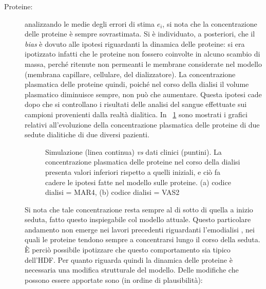 \begin{description}
	\item[Proteine:] analizzando le medie degli errori di stima $e_i$, si nota che la concentrazione delle proteine è sempre sovrastimata. Si è individuato, a posteriori, che il \textit{bias} è dovuto alle ipotesi riguardanti la dinamica delle proteine: si era ipotizzato infatti che le proteine non fossero coinvolte in alcuno scambio di massa, perché ritenute non permeanti le membrane considerate nel modello (membrana capillare, cellulare, del dializzatore). La concentrazione plasmatica delle proteine quindi, poiché nel corso della dialisi il volume plasmatico diminuisce sempre, non può che aumentare. Questa ipotesi cade dopo che si controllano i risultati delle analisi del sangue effettuate sui campioni provenienti dalla realtà dialitica. In \figurename~\ref{fig:real_prot} sono mostrati i grafici relativi all'evoluzione della concentrazione plasmatica delle proteine di due sedute dialitiche di due diversi pazienti. 
\begin{figure}[!h]
	\centering
	\qquad
		\caption{Simulazione (linea continua) \textit{vs} dati clinici (puntini). La concentrazione plasmatica delle proteine nel corso della dialisi presenta valori inferiori rispetto a quelli iniziali, e ciò fa cadere le ipotesi fatte nel modello sulle proteine. (a) codice dialisi = MAR4, (b) codice dialisi = VAS2}\label{fig:real_prot}
\end{figure}
Si nota che tale concentrazione resta sempre al di sotto di quella a inizio seduta, fatto questo inspiegabile col modello attuale. Questo particolare andamento non emerge nei lavori precedenti riguardanti l'emodialisi \cite{casagrande, gatti}, nei quali le proteine tendono sempre a concentrarsi lungo il corso della seduta. È perciò possibile ipotizzare che questo comportamento sia tipico dell'HDF. Per quanto riguarda quindi la dinamica delle proteine è necessaria una modifica strutturale del modello. Delle modifiche che possono essere apportate sono (in ordine di plausibilità):

\end{description}
